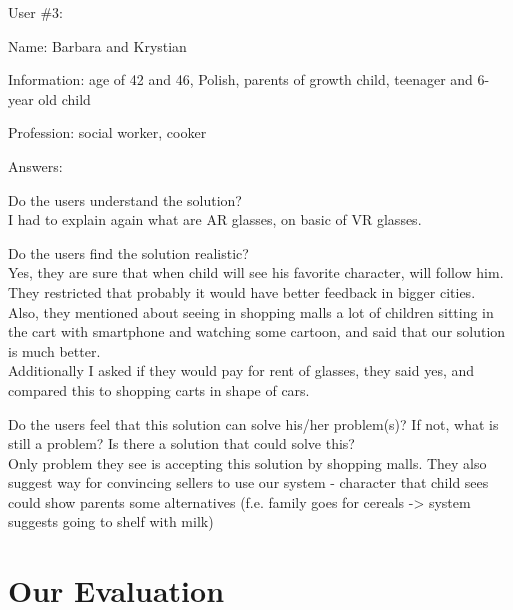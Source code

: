 \documentclass[a4paper,10pt,oneside]{scrreprt}
\begin{document}
User \#3:
\begin{compactitem}
	\item Name: Barbara and Krystian
	\item Information: age of 42 and 46, Polish, parents of growth child, teenager and 6-year old child
	\item Profession: social worker, cooker
\end{compactitem}
\bigskip

Answers:
\begin{compactitem}
	\item Do the users understand the solution?\\
	I had to explain again what are AR glasses, on basic of VR glasses.\\

	\item Do the users find the solution realistic?\\
	Yes, they are sure that when child will see his favorite character, will follow him. They restricted that probably it would have better feedback in bigger cities.\\
	Also, they mentioned about seeing in shopping malls a lot of children sitting in the cart with smartphone and watching some cartoon, and said that our solution is much better.\\
	Additionally I asked if they would pay for rent of glasses, they said yes, and compared this to shopping carts in shape of cars.\\

	\item Do the users feel that this solution can solve his/her problem(s)? If not, what is still
	a problem? Is there a solution that could solve this?\\
	Only problem they see is accepting this solution by shopping malls. They also suggest way for convincing sellers to use our system - character that child sees could show parents some alternatives (f.e. family goes for cereals -> system suggests going to shelf with milk)\\
\end{compactitem}

\clearpage

\chapter{Our Evaluation}
\end{document}
